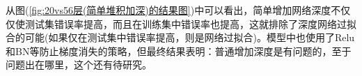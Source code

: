             从图(\ref{fig:20vs56层(简单堆积加深)的结果图})中可以看出，简单增加网络深度不仅仅使测试集错误率提高，而且在训练集中错误率也提高，这就排除了深度网络过拟合的可能(如果仅在测试集中错误率提高，则是网络过拟合)。模型中也使用了Relu和BN等防止梯度消失的策略，但最终结果表明：普通增加深度是有问题的，至于问题出在哪里，这个还有待研究。
